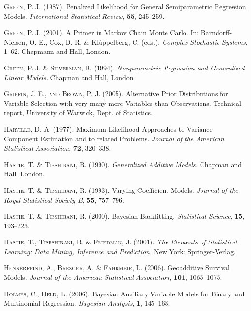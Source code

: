 \documentclass[11pt,a4paper,twoside]{bayesxarticle}
\begin{document}
\begin{thebibliography}{99}
 {\scshape Green, P. J.} (1987).
 Penalized Likelihood for General Semiparametric Regression Models.
 {\it International Statistical Review}, {\bf 55}, 245--259.

 {\scshape Green, P. J.} (2001).
 A Primer in Markov Chain Monte Carlo.
 In: Barndorff-Nielsen, O. E., Cox, D. R. \& Kl\"{u}ppelberg, C. (eds.),
 {\it Complex Stochastic Systems}, 1--62.
 Chapmann and Hall, London.

 {\scshape Green, P. J. \& Silverman, B.} (1994).
 {\it Nonparametric Regression and Generalized Linear Models.}
 Chapman and Hall, London.

 {\scshape Griffin, J. E., and Brown, P. J.} (2005). Alternative Prior Distributions
 for Variable Selection with very many more Variables than Observations. Technical
 report, University of Warwick, Dept. of Statistics.

 {\scshape Harville, D. A.} (1977).
 Maximum Likelihood Approaches to Variance Component Estimation and to related Problems.
 {\it Journal of the American Statistical Association}, {\bf 72}, 320--338.

 {\scshape Hastie, T. \& Tibshirani, R.} (1990).
 {\it Generalized Additive Models.}
 Chapman and Hall, London.

 {\scshape Hastie, T. \& Tibshirani, R.} (1993).
 Varying-Coefficient Models.
 {\it Journal of the Royal Statistical Society B}, {\bf 55}, 757--796.

 {\scshape Hastie, T. \& Tibshirani, R.} (2000).
 Bayesian Backfitting.
 {\it Statistical Science}, {\bf 15}, 193--223.

 {\scshape Hastie, T., Tisbshirani, R. \& Friedman, J.} (2001).
 {\it The Elements of Statistical Learning: Data Mining, Inference and Prediction.}
 New York: Springer-Verlag.

 {\scshape Hennerfeind, A., Brezger, A. \& Fahrmeir, L.} (2006).
 Geoadditive Survival Models.
 {\it Journal of the American Statistical Association}, {\bf 101}, 1065--1075.

 {\scshape Holmes, C., Held, L.} (2006).
 Bayesian Auxiliary Variable Models for Binary and Multinomial Regression.
 {\it Bayesian Analysis}, {\bf 1}, 145--168.


\end{thebibliography}
\end{document}
